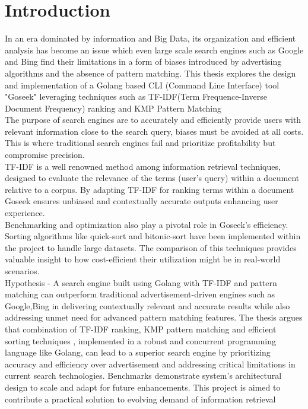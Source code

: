 \chapter{Introduction}
In an era dominated by information and Big Data, its organization and efficient analysis has become an issue which even large scale search engines such as Google and Bing find their limitations in a form of biases introduced by advertising algorithms and the absence of pattern matching.
This thesis explores the design and implementation of a Golang based CLI (Command Line Interface) tool "Goseek" leveraging techniques such as TF-IDF(Term Frequence-Inverse Document Frequency)\cite{wikipedia_tf_idf} ranking and KMP Pattern Matching\cite{wikipedia_kmp} \\
The purpose of search engines are to accurately and efficiently provide users with relevant information close to the search query, biases must be avoided at all costs.
This is where traditional search engines fail and prioritize profitability but compromise precision. \\
TF-IDF is a well renowned method among information retrieval techniques, designed to evaluate the relevance of the terms (user's query) within a document relative to a corpus.
By adapting TF-IDF for ranking terms within a document Goseek ensures unbiased and contextually accurate outputs enhancing user experience. \\
Benchmarking and optimization also play a pivotal role in Goseek's efficiency.
Sorting algorithms like quick-sort and bitonic-sort have been implemented within the project to handle large datasets.
The comparison of this techniques provides valuable insight to how  cost-efficient their utilization might be in real-world scenarios. \\
Hypothesis - A search engine built using Golang with TF-IDF and pattern matching can outperform traditional advertisement-driven engines such as Google,Bing in delivering contextually relevant and accurate results while also addressing unmet need for advanced pattern matching features.
The thesis argues that combination of TF-IDF ranking, KMP pattern matching and efficient sorting techniques , implemented in a robust and concurrent programming language like Golang, can lead to a superior search engine by prioritizing accuracy and efficiency over advertisement and addressing critical limitations in current search technologies.
Benchmarks demonstrate system's architectural design to scale and adapt for future enhancements.
This project is aimed to contribute a practical solution to evolving demand of information retrieval
